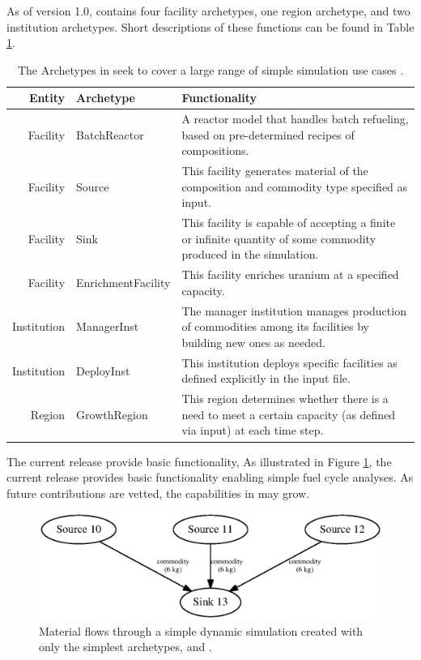 As of version 1.0, \Cycamore contains four facility archetypes, one region
archetype, and two institution archetypes. Short descriptions of these
functions can be found in Table \ref{tab:cycamore}.


\begin{table}[h]
\centering
\begin{tabularx}{\textwidth}{|r|l|X|}
\hline
\textbf{Entity} & \textbf{Archetype} & \textbf{Functionality} \\
\hline
Facility & BatchReactor & A reactor model that handles batch refueling, based on pre-determined recipes of compositions. \\
Facility & Source & This facility generates material of the composition and commodity type specified as input.  \\
Facility & Sink & This facility is capable of accepting a finite or infinite quantity of some commodity produced in the simulation. \\
Facility & EnrichmentFacility & This facility enriches uranium at a specified capacity. \\
Institution & ManagerInst & The manager institution manages production of commodities among its facilities by building new ones as needed. \\
Institution & DeployInst &  This institution deploys specific facilities as defined explicitly in the input file. \\
Region & GrowthRegion & This region determines whether there is a need to meet a certain capacity (as defined via input) at each time step. \\
\hline
\end{tabularx}
\caption{The Archetypes in \Cycamore seek to cover a large range of simple simulation use cases \cite{carlsen_cycamore_2014}.}
\label{tab:cycamore}
\end{table}

The current \Cycamore release provide basic functionality, As illustrated in
Figure \ref{fig:simplesim}, the current \Cycamore release provides basic
functionality enabling simple fuel cycle analyses. As future contributions are
vetted, the capabilities in \Cycamore may grow.

\begin{figure}[htbp!]
\begin{center}
\includegraphics{./images/simplesim}
\end{center}
\caption{Material flows through a simple dynamic simulation created with only the simplest \Cycamore archetypes,  and .}
\label{fig:simplesim}
\end{figure}


